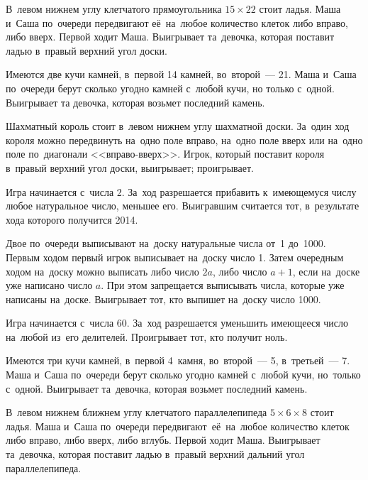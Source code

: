 \begin{problems}

\item
В~левом нижнем углу клетчатого прямоугольника $15 \times 22$ стоит ладья.
Маша и~Саша по~очереди передвигают её~на~любое количество клеток либо вправо,
либо вверх.
Первой ходит Маша.
Выигрывает та~девочка, которая поставит ладью в~правый верхний угол доски.

\item
Имеются две кучи камней, в~первой 14 камней, во~второй~--- 21.
Маша и~Саша по~очереди берут сколько угодно камней с~любой кучи, но только
с~одной.
Выигрывает та девочка, которая возьмет последний камень.

\item
Шахматный король стоит в~левом нижнем углу шахматной доски.
За~один ход короля можно передвинуть на~одно поле вправо, на~одно поле вверх
или на~одно поле по~диагонали <<вправо-вверх>>.
Игрок, который поставит короля в~правый верхний угол доски,
\quad
\sbp выигрывает;
\quad
\sbp проигрывает.
\quad

\item
Игра начинается с~числа 2.
За~ход разрешается прибавить к~имеющемуся числу любое натуральное число,
меньшее его.
Выигравшим считается тот, в~результате хода которого получится 2014.

\item
Двое по~очереди выписывают на~доску натуральные числа от~1 до~1000.
Первым ходом первый игрок выписывает на~доску число 1.
Затем очередным ходом на~доску можно выписать либо число $2a$, либо число
$a + 1$, если на~доске уже написано число $a$.
При этом запрещается выписывать числа, которые уже написаны на~доске.
Выигрывает тот, кто выпишет на~доску число 1000.

\item
Игра начинается с~числа 60.
За~ход разрешается уменьшить имеющееся число на~любой из~его делителей.
Проигрывает тот, кто получит ноль.

\item
Имеются три кучи камней, в~первой 4~камня, во~второй~--- 5, в~третьей~--- 7.
Маша и~Саша по~очереди берут сколько угодно камней с~любой кучи, но~только
с~одной.
Выигрывает та~девочка, которая возьмет последний камень.

\item
В~левом нижнем ближнем углу клетчатого параллелепипеда $5 \times 6 \times 8$
стоит ладья.
Маша и~Саша по~очереди передвигают~её~на~любое количество клеток либо вправо,
либо вверх, либо вглубь.
Первой ходит Маша.
Выигрывает та~девочка, которая поставит ладью в~правый верхний дальний угол
параллелепипеда.

\end{problems}

